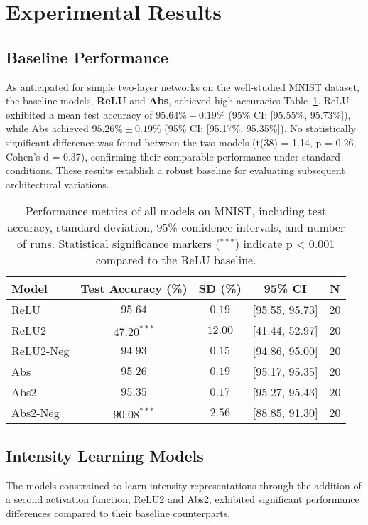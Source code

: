 \section{Experimental Results}
\label{sec:results}

\subsection{Baseline Performance}
As anticipated for simple two-layer networks on the well-studied MNIST dataset, the baseline models, \textbf{ReLU} and \textbf{Abs}, achieved high accuracies Table~\ref{tab:baseline_performance}. ReLU exhibited a mean test accuracy of $95.64\% \pm 0.19\%$ (95\% CI: [95.55\%, 95.73\%]), while Abs achieved $95.26\% \pm 0.19\%$ (95\% CI: [95.17\%, 95.35\%]). No statistically significant difference was found between the two models (t(38) = 1.14, p = 0.26, Cohen's d = 0.37), confirming their comparable performance under standard conditions. These results establish a robust baseline for evaluating subsequent architectural variations.

\begin{table}[H]
    \centering
    \footnotesize
    \begin{tabular}{lcccc}
    \toprule
    \textbf{Model} & \textbf{Test Accuracy (\%)} & \textbf{SD (\%)} & \textbf{95\% CI} & \textbf{N} \\
    \midrule
    ReLU & $95.64$ & $0.19$ & [95.55, 95.73] & 20 \\
    ReLU2 & $47.20^{***}$ & $12.00$ & [41.44, 52.97] & 20 \\
    ReLU2-Neg & $94.93$ & $0.15$ & [94.86, 95.00] & 20 \\
    Abs & $95.26$ & $0.19$ & [95.17, 95.35] & 20 \\
    Abs2 & $95.35$ & $0.17$ & [95.27, 95.43] & 20 \\
    Abs2-Neg & $90.08^{***}$ & $2.56$ & [88.85, 91.30] & 20 \\
    \bottomrule
    \end{tabular}
    \caption{Performance metrics of all models on MNIST, including test accuracy, standard deviation, 95\% confidence intervals, and number of runs. Statistical significance markers ($^{***}$) indicate p < 0.001 compared to the ReLU baseline.}
    \label{tab:baseline_performance}
\end{table}

\subsection{Intensity Learning Models}
The models constrained to learn intensity representations through the addition of a second activation function, ReLU2 and Abs2, exhibited significant performance differences compared to their baseline counterparts. 

